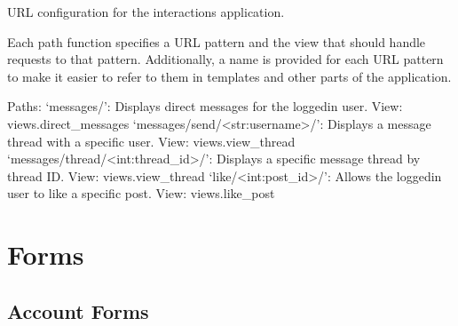 \documentclass[letterpaper,10pt,english]{sphinxmanual}
\begin{document}
\begin{fulllineitems}
\label{\detokenize{modules/urls:interactions.urls.urlpatterns}}
\pysigstartsignatures
{}
\pysigstopsignatures
\sphinxAtStartPar
URL configuration for the interactions application.

\sphinxAtStartPar
Each path function specifies a URL pattern and the view that should handle
requests to that pattern. Additionally, a name is provided for each URL pattern
to make it easier to refer to them in templates and other parts of the application.

\sphinxAtStartPar
Paths:
\sphinxhyphen{} ‘messages/’: Displays direct messages for the logged\sphinxhyphen{}in user. View: views.direct\_messages
\sphinxhyphen{} ‘messages/send/\textless{}str:username\textgreater{}/’: Displays a message thread with a specific user. View: views.view\_thread
\sphinxhyphen{} ‘messages/thread/\textless{}int:thread\_id\textgreater{}/’: Displays a specific message thread by thread ID. View: views.view\_thread
\sphinxhyphen{} ‘like/\textless{}int:post\_id\textgreater{}/’: Allows the logged\sphinxhyphen{}in user to like a specific post. View: views.like\_post

\end{fulllineitems}


\sphinxstepscope


\chapter{Forms}
\label{\detokenize{modules/forms:forms}}\label{\detokenize{modules/forms::doc}}

\section{Account Forms}
\label{\detokenize{modules/forms:module-account.forms}}\label{\detokenize{modules/forms:account-forms}}
\end{document}
